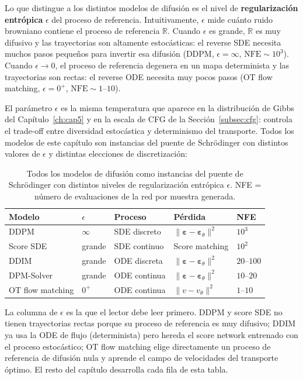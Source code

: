 Lo que distingue a los distintos modelos de difusión es el nivel de
\textbf{regularización entrópica} $\epsilon$ del proceso de referencia.
Intuitivamente, $\epsilon$ mide cuánto ruido browniano contiene el proceso
de referencia $\mathbb{R}$. Cuando $\epsilon$ es grande, $\mathbb{R}$
es muy difusivo y las trayectorias son altamente estocásticas: el reverse
SDE necesita muchos pasos pequeños para invertir esa difusión (DDPM,
$\epsilon=\infty$, $\mathrm{NFE}\sim 10^3$). Cuando $\epsilon\to 0$,
el proceso de referencia degenera en un mapa determinista y las
trayectorias son rectas: el reverse ODE necesita muy pocos pasos
(OT flow matching, $\epsilon=0^+$, $\mathrm{NFE}\sim 1$--$10$).

El parámetro $\epsilon$ es la misma temperatura que aparece en la
distribución de Gibbs del Capítulo~\ref{ch:cap5} y en la escala de
CFG de la Sección~\ref{subsec:cfg}: controla el trade-off entre
diversidad estocástica y determinismo del transporte. Todos los modelos
de este capítulo son instancias del puente de Schrödinger con distintos
valores de $\epsilon$ y distintas elecciones de discretización:

\begin{table}[ht]
\centering
\begin{tabular}{lllll}
\toprule
\textbf{Modelo} & $\epsilon$ & \textbf{Proceso} & \textbf{Pérdida}
  & \textbf{NFE} \\
\midrule
DDPM      & $\infty$ & SDE discreto
  & $\|\bm{\varepsilon}-\bm{\varepsilon}_\theta\|^2$ & $10^3$ \\
Score SDE & grande   & SDE continuo
  & Score matching                                   & $10^2$ \\
DDIM      & grande   & ODE discreta
  & $\|\bm{\varepsilon}-\bm{\varepsilon}_\theta\|^2$ & $20$--$100$ \\
DPM-Solver& grande   & ODE continua
  & $\|\bm{\varepsilon}-\bm{\varepsilon}_\theta\|^2$ & $10$--$20$ \\
OT flow matching & $0^+$ & ODE continua
  & $\|v-v_\theta\|^2$                               & $1$--$10$ \\
\bottomrule
\end{tabular}
\caption{Todos los modelos de difusión como instancias del puente de
Schrödinger con distintos niveles de regularización entrópica $\epsilon$.
NFE = número de evaluaciones de la red por muestra generada.}
\label{tab:unificacion}
\end{table}

La columna de $\epsilon$ es la que el lector debe leer primero.
DDPM y score SDE no tienen trayectorias rectas porque su proceso
de referencia es muy difusivo; DDIM ya usa la ODE de flujo (determinista)
pero hereda el score network entrenado con el proceso estocástico;
OT flow matching elige directamente un proceso de referencia de difusión
nula y aprende el campo de velocidades del transporte óptimo.
El resto del capítulo desarrolla cada fila de esta tabla.

